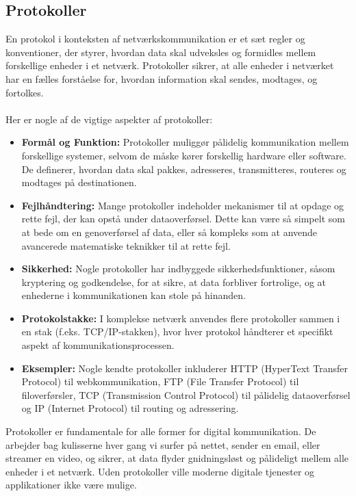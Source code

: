 \subsection{Protokoller}
En protokol i konteksten af netværkskommunikation er et sæt regler og konventioner, der styrer, hvordan data skal udveksles og formidles mellem forskellige enheder i et netværk. Protokoller sikrer, at alle enheder i netværket har en fælles forståelse for, hvordan information skal sendes, modtages, og fortolkes.\\
\\	
Her er nogle af de vigtige aspekter af protokoller:
\begin{itemize}
	\item \textbf{Formål og Funktion:} Protokoller muliggør pålidelig kommunikation mellem forskellige systemer, selvom de måske kører forskellig hardware eller software. De definerer, hvordan data skal pakkes, adresseres, transmitteres, routeres og modtages på destinationen.
	\item \textbf{Fejlhåndtering:} Mange protokoller indeholder mekanismer til at opdage og rette fejl, der kan opstå under dataoverførsel. Dette kan være så simpelt som at bede om en genoverførsel af data, eller så kompleks som at anvende avancerede matematiske teknikker til at rette fejl.
	\item \textbf{Sikkerhed:} Nogle protokoller har indbyggede sikkerhedsfunktioner, såsom kryptering og godkendelse, for at sikre, at data forbliver fortrolige, og at enhederne i kommunikationen kan stole på hinanden.
	\item \textbf{Protokolstakke:} I komplekse netværk anvendes flere protokoller sammen i en stak (f.eks. TCP/IP-stakken), hvor hver protokol håndterer et specifikt aspekt af kommunikationsprocessen.
	\item \textbf{Eksempler:} Nogle kendte protokoller inkluderer HTTP (HyperText Transfer Protocol) til webkommunikation, FTP (File Transfer Protocol) til filoverførsler, TCP (Transmission Control Protocol) til pålidelig dataoverførsel og IP (Internet Protocol) til routing og adressering.
\end{itemize}
Protokoller er fundamentale for alle former for digital kommunikation. De arbejder bag kulisserne hver gang vi surfer på nettet, sender en email, eller streamer en video, og sikrer, at data flyder gnidningsløst og pålideligt mellem alle enheder i et netværk. Uden protokoller ville moderne digitale tjenester og applikationer ikke være mulige.
